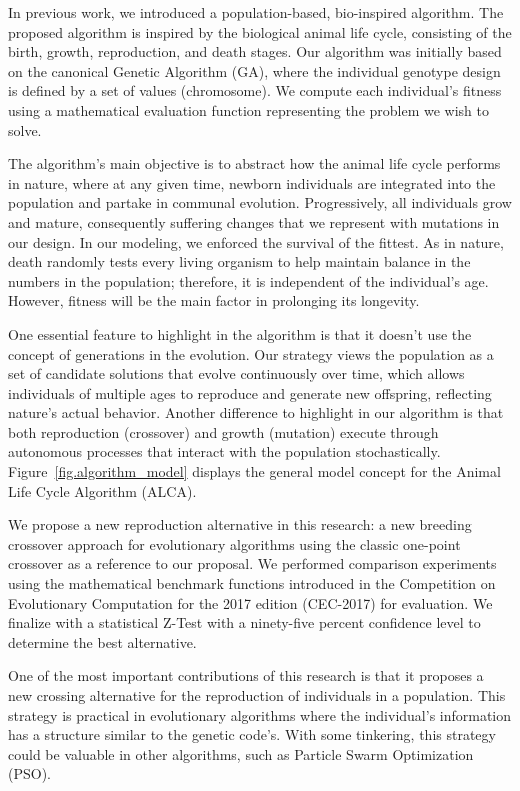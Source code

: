 \documentclass[graybox]{svmult}
\begin{document}
    In previous work, we introduced a population-based, bio-inspired algorithm\cite{Felix-Saul2022,Felix-Saul2023}. The proposed algorithm is inspired by the biological animal life cycle, consisting of the birth, growth, reproduction, and death stages\cite{read1968system}. Our algorithm was initially based on the canonical Genetic Algorithm (GA)\cite{holland1992genetic,holland1984genetic}, where the individual genotype design is defined by a set of values (chromosome). We compute each individual's fitness using a mathematical evaluation function representing the problem we wish to solve.
    
    The algorithm's main objective is to abstract how the animal life cycle performs in nature, where at any given time, newborn individuals are integrated into the population and partake in communal evolution. Progressively, all individuals grow and mature, consequently suffering changes that we represent with mutations in our design. In our modeling, we enforced the survival of the fittest. As in nature, death randomly tests every living organism to help maintain balance in the numbers in the population; therefore, it is independent of the individual's age. However, fitness will be the main factor in prolonging its longevity.

    One essential feature to highlight in the algorithm is that it doesn't use the concept of generations in the evolution. Our strategy views the population as a set of candidate solutions that evolve continuously over time, which allows individuals of multiple ages to reproduce and generate new offspring, reflecting nature's actual behavior. Another difference to highlight in our algorithm is that both reproduction (crossover) and growth (mutation) execute through autonomous processes that interact with the population stochastically. Figure~\ref{fig.algorithm_model} displays the general model concept for the Animal Life Cycle Algorithm (ALCA)\cite{Felix-Saul2023}.

    We propose a new reproduction alternative in this research: a new breeding crossover approach for evolutionary algorithms using the classic one-point crossover as a reference to our proposal. We performed comparison experiments using the mathematical benchmark functions introduced in the Competition on Evolutionary Computation for the 2017 edition (CEC-2017) for evaluation. We finalize with a statistical Z-Test with a ninety-five percent confidence level to determine the best alternative.

    One of the most important contributions of this research is that it proposes a new crossing alternative for the reproduction of individuals in a population. This strategy is practical in evolutionary algorithms where the individual's information has a structure similar to the genetic code's. With some tinkering, this strategy could be valuable in other algorithms\cite{venter2003particle,wang2018particle}, such as Particle Swarm Optimization (PSO).
\end{document}
